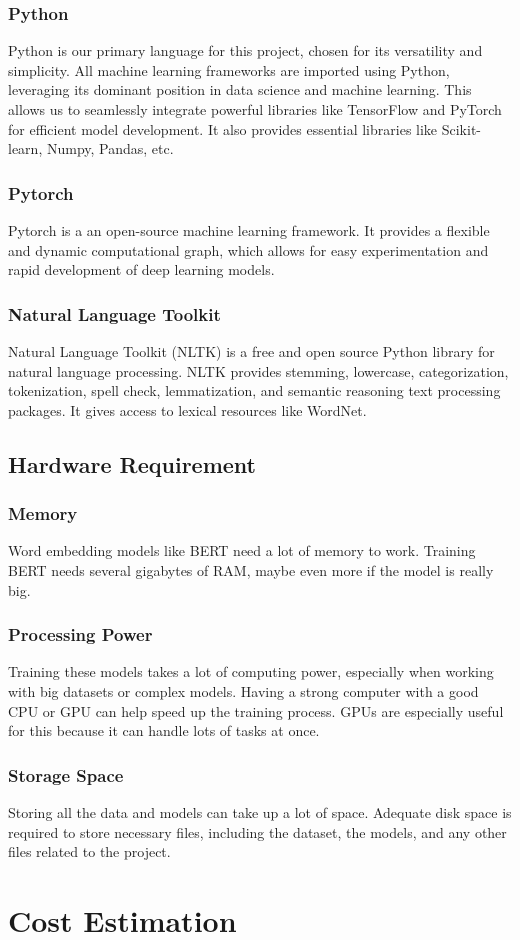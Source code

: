     \subsubsection*{Python} 
    Python is our primary language for this project, chosen for its versatility and simplicity. All machine learning frameworks are imported using Python, leveraging its dominant position in data science and machine learning. This allows us to seamlessly integrate powerful libraries like TensorFlow and PyTorch for efficient model development. It also provides essential libraries like Scikit-learn, Numpy, Pandas, etc.

    \subsubsection*{Pytorch}
    Pytorch is a an open-source machine learning framework. It provides a flexible and dynamic computational graph, which allows for easy experimentation and rapid development of deep learning models. 

    \subsubsection*{Natural Language Toolkit}
    Natural Language Toolkit (NLTK) is a free and open source Python library for natural language processing. NLTK provides stemming, lowercase, categorization, tokenization, spell check, lemmatization, and semantic reasoning text processing packages. It gives access to lexical resources like WordNet.


    \subsection{Hardware Requirement}
    \subsubsection*{Memory}
    Word embedding models like BERT need a lot of memory to work. Training BERT needs several gigabytes of RAM, maybe even more if the model is really big. 

    \subsubsection*{Processing Power}
    Training these models takes a lot of computing power, especially when working with big datasets or complex models. Having a strong computer with a good CPU or GPU can help speed up the training process. GPUs are especially useful for this because it can handle lots of tasks at once.

    \subsubsection*{Storage Space}
    Storing all the data and models can take up a lot of space. Adequate disk space is required to store necessary files, including the dataset, the models, and any other files related to the project.

\section{Cost Estimation}

